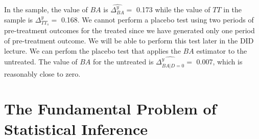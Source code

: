 \documentclass[]{book}
\theoremstyle{definition}
\theoremstyle{definition}
\theoremstyle{definition}
\theoremstyle{remark}
\begin{document}
In the sample, the value of \(BA\) is \(\hat{\Delta^y_{BA}}=\) 0.173
while the value of \(TT\) in the sample is \(\Delta^y_{TT_s}=\) 0.168.
We cannot perform a placebo test using two periods of pre-treatment
outcomes for the treated since we have generated only one period of
pre-treatment outcome. We will be able to perform this test later in the
DID lecture. We can perfom the placebo test that applies the \(BA\)
estimator to the untreated. The value of \(BA\) for the untreated is
\(\hat{\Delta^y_{BA|D=0}}=\) 0.007, which is reasonably close to zero.

\chapter{The Fundamental Problem of Statistical
Inference}\label{the-fundamental-problem-of-statistical-inference}
\end{document}
